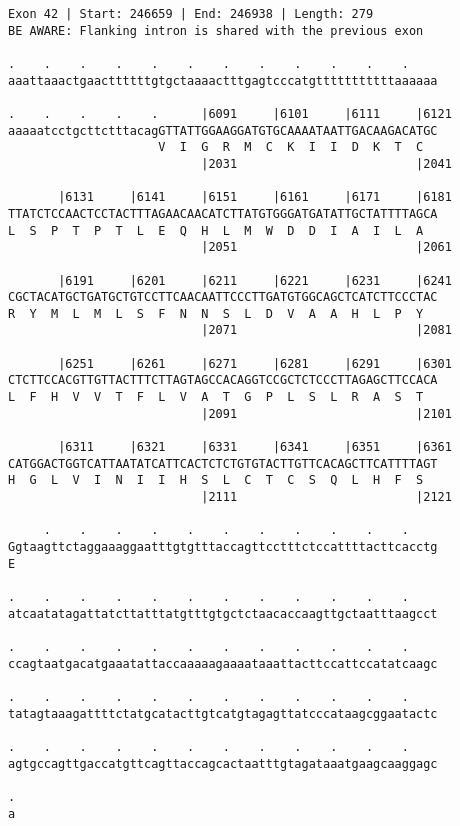 \documentclass{article}
\begin{document}
\begin{Verbatim}
Exon 42 | Start: 246659 | End: 246938 | Length: 279
BE AWARE: Flanking intron is shared with the previous exon
 
.    .    .    .    .    .    .    .    .    .    .    .    
aaattaaactgaacttttttgtgctaaaactttgagtcccatgtttttttttttaaaaaa
  
.    .    .    .    .      |6091     |6101     |6111     |6121
aaaaatcctgcttctttacagGTTATTGGAAGGATGTGCAAAATAATTGACAAGACATGC
                     V  I  G  R  M  C  K  I  I  D  K  T  C  
                           |2031                         |2041
  
       |6131     |6141     |6151     |6161     |6171     |6181
TTATCTCCAACTCCTACTTTAGAACAACATCTTATGTGGGATGATATTGCTATTTTAGCA
L  S  P  T  P  T  L  E  Q  H  L  M  W  D  D  I  A  I  L  A  
                           |2051                         |2061
  
       |6191     |6201     |6211     |6221     |6231     |6241
CGCTACATGCTGATGCTGTCCTTCAACAATTCCCTTGATGTGGCAGCTCATCTTCCCTAC
R  Y  M  L  M  L  S  F  N  N  S  L  D  V  A  A  H  L  P  Y  
                           |2071                         |2081
  
       |6251     |6261     |6271     |6281     |6291     |6301
CTCTTCCACGTTGTTACTTTCTTAGTAGCCACAGGTCCGCTCTCCCTTAGAGCTTCCACA
L  F  H  V  V  T  F  L  V  A  T  G  P  L  S  L  R  A  S  T  
                           |2091                         |2101
  
       |6311     |6321     |6331     |6341     |6351     |6361
CATGGACTGGTCATTAATATCATTCACTCTCTGTGTACTTGTTCACAGCTTCATTTTAGT
H  G  L  V  I  N  I  I  H  S  L  C  T  C  S  Q  L  H  F  S  
                           |2111                         |2121
  
     .    .    .    .    .    .    .    .    .    .    .    
Ggtaagttctaggaaaggaatttgtgtttaccagttcctttctccattttacttcacctg
E                                                           
  
.    .    .    .    .    .    .    .    .    .    .    .    
atcaatatagattatcttatttatgtttgtgctctaacaccaagttgctaatttaagcct
  
.    .    .    .    .    .    .    .    .    .    .    .    
ccagtaatgacatgaaatattaccaaaaagaaaataaattacttccattccatatcaagc
  
.    .    .    .    .    .    .    .    .    .    .    .    
tatagtaaagattttctatgcatacttgtcatgtagagttatcccataagcggaatactc
  
.    .    .    .    .    .    .    .    .    .    .    .    
agtgccagttgaccatgttcagttaccagcactaatttgtagataaatgaagcaaggagc
  
.
a
\end{Verbatim}
\end{document}
